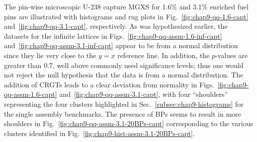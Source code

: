 The pin-wise microscopic U-238 capture \ac{MGXS} for 1.6\% and 3.1\% enriched fuel pins are illustrated with histograms and rug plots in Fig.~\ref{fig:chap9-qq-1.6-capt} and~\ref{fig:chap9-qq-3.1-capt}, respectively. As was hypothesized earlier, the datasets for the infinite lattices in Figs.~\ref{fig:chap9-qq-assm-1.6-inf-capt} and~\ref{fig:chap9-qq-assm-3.1-inf-capt} appear to be from a normal distribution since they lie very close to the $y = x$ reference line. In addition, the $p$-values are greater than 0.7, well above commonly used significance levels; thus one would not reject the null hypothesis that the data is from a normal distribution. The addition of \acp{CRGT} leads to a clear deviation from normality in Figs.~\ref{fig:chap9-qq-assm-1.6-capt} and~\ref{fig:chap9-qq-assm-3.1-capt}, with four ``shoulders'' representing the four clusters highlighted in Sec.~\ref{subsec:chap9-histograms} for the single assembly benchmarks. The presence of \acp{BP} seems to result in more shoulders in Fig.~\ref{fig:chap9-qq-assm-3.1-20BPs-capt} corresponding to the various clusters identified in Fig.~\ref{fig:chap9-hist-assm-3.1-20BPs-capt}. 

